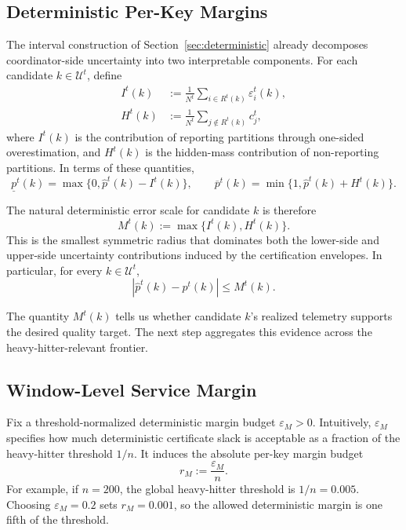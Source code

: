 \documentclass[sigconf, nonacm]{acmart}
\begin{document}
\subsection{Deterministic Per-Key Margins}
\label{subsec:req-margins}

The interval construction of Section~\ref{sec:deterministic} already decomposes coordinator-side uncertainty into two interpretable components. For each candidate \(k \in \mathcal U^t\), define
\begin{align}
I^t(k)
&:=
\frac{1}{N^t}
\sum_{i \in R^t(k)} \varepsilon_i^t(k),
\label{eq:req-inflation}
\\[0.75ex]
H^t(k)
&:=
\frac{1}{N^t}
\sum_{j \notin R^t(k)} c_j^t,
\label{eq:req-hidden}
\end{align}
where \(I^t(k)\) is the contribution of reporting partitions through one-sided overestimation, and \(H^t(k)\) is the hidden-mass contribution of non-reporting partitions. In terms of these quantities,
\[
\underline p^t(k) = \max\{0,\hat p^t(k)-I^t(k)\},
\qquad
\overline p^t(k) = \min\{1,\hat p^t(k)+H^t(k)\}.
\]

The natural deterministic error scale for candidate \(k\) is therefore
\begin{equation}
\label{eq:req-margin}
M^t(k) := \max\{I^t(k), H^t(k)\}.
\end{equation}
This is the smallest symmetric radius that dominates both the lower-side and upper-side uncertainty contributions induced by the certification envelopes. In particular, for every \(k \in \mathcal U^t\),
\[
|\hat p^t(k)-p^t(k)| \le M^t(k).
\]

The quantity \(M^t(k)\) tells us whether candidate \(k\)'s realized telemetry supports the desired quality target. The next step aggregates this evidence across the heavy-hitter-relevant frontier.

\subsection{Window-Level Service Margin}
\label{subsec:req-perkey}

Fix a threshold-normalized deterministic margin budget \(\varepsilon_M > 0\). Intuitively, \(\varepsilon_M\) specifies how much deterministic certificate slack is acceptable as a fraction of the heavy-hitter threshold \(1/n\). It induces the absolute per-key margin budget
\[
r_M := \frac{\varepsilon_M}{n}.
\]
For example, if \(n=200\), the global heavy-hitter threshold is \(1/n=0.005\). Choosing \(\varepsilon_M=0.2\) sets \(r_M=0.001\), so the allowed deterministic margin is one fifth of the threshold.
\end{document}
